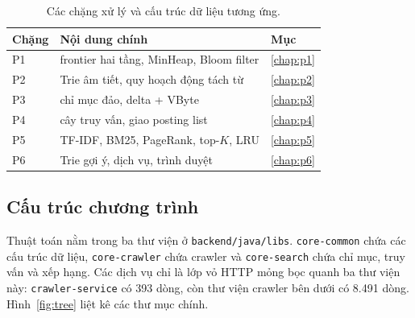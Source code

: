 \documentclass[9pt,twocolumn,a4paper]{extarticle}
\newcommand{\code}[1]{\texttt{#1}}
\begin{document}
\begin{table}[H]
\centering
\caption{Các chặng xử lý và cấu trúc dữ liệu tương ứng.}
\label{tab:map}
\footnotesize
\begin{tabular}{@{}lp{4.6cm}l@{}}
\toprule
Chặng & Nội dung chính & Mục \\
\midrule
P1 & frontier hai tầng, MinHeap, Bloom filter & \ref{chap:p1} \\
P2 & Trie âm tiết, quy hoạch động tách từ & \ref{chap:p2} \\
P3 & chỉ mục đảo, delta + VByte & \ref{chap:p3} \\
P4 & cây truy vấn, giao posting list & \ref{chap:p4} \\
P5 & TF-IDF, BM25, PageRank, top-$K$, LRU & \ref{chap:p5} \\
P6 & Trie gợi ý, dịch vụ, trình duyệt & \ref{chap:p6} \\
\bottomrule
\end{tabular}
\end{table}

\subsection{Cấu trúc chương trình}
Thuật toán nằm trong ba thư viện ở \code{backend/java/libs}. \code{core-common} chứa các cấu trúc dữ liệu, \code{core-crawler} chứa crawler và \code{core-search} chứa chỉ mục, truy vấn và xếp hạng. Các dịch vụ chỉ là lớp vỏ HTTP mỏng bọc quanh ba thư viện này: \code{crawler-service} có 393 dòng, còn thư viện crawler bên dưới có 8.491 dòng. Hình~\ref{fig:tree} liệt kê các thư mục chính.
\end{document}
